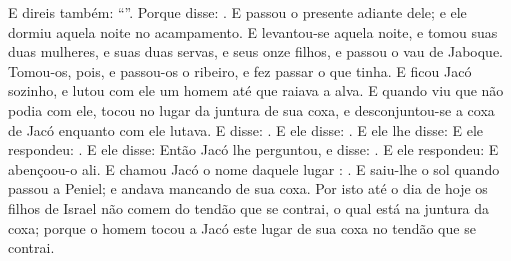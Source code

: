 {{{  E direis também: \enquote{}.} Porque disse: .
  E passou o presente adiante dele; e ele dormiu aquela noite no acampamento.
  E levantou-se aquela noite, e tomou suas duas mulheres, e suas duas servas, e seus onze filhos, e passou o vau de Jaboque.
  Tomou-os, pois, e passou-os o ribeiro, e fez passar o que tinha.
  E ficou Jacó sozinho, e lutou com ele um homem até que raiava a alva.
  E quando viu que não podia com ele, tocou no lugar da juntura de sua coxa, e desconjuntou-se a coxa de Jacó enquanto com ele lutava.
  E disse: . E ele disse: .
  E ele lhe disse:  E ele respondeu: .
  E ele disse: 
  Então Jacó lhe perguntou, e disse: . E ele respondeu:  E abençoou-o ali.
  E chamou Jacó o nome daquele lugar : .
  E saiu-lhe o sol quando passou a Peniel; e andava mancando de sua coxa.
  Por isto até o dia de hoje os filhos de Israel não comem do tendão que se contrai, o qual está na juntura da coxa; porque o homem tocou a Jacó este lugar de sua coxa no tendão que se contrai.
\par }

}
